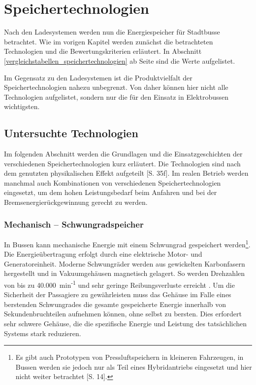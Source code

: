 \chapter{Speichertechnologien}

Nach den Ladesystemen werden nun die Energiespeicher für Stadtbusse betrachtet. Wie im vorigen Kapitel werden zunächst die betrachteten Technologien und die Bewertungskriterien erläutert. In Abschnitt \ref{vergleichstabellen_speichertechnologien} ab Seite \pageref{vergleichstabellen_speichertechnologien} sind die Werte aufgelistet.

Im Gegensatz zu den Ladesystemen ist die Produktvielfalt der Speichertechnologien nahezu unbegrenzt. Von daher können hier nicht alle Technologien aufgelistet, sondern nur die für den Einsatz in Elektrobussen wichtigsten. 

\section{Untersuchte Technologien}
Im folgenden Abschnitt werden die Grundlagen und die Einsatzgeschichten der verschiedenen Speichertechnologien kurz erläutert. Die Technologien sind nach dem genutzten physikalischen Effekt aufgeteilt \cite{Sterner:2014}[S. 35f]. Im realen Betrieb werden manchmal auch Kombinationen von verschiedenen Speichertechnologien eingesetzt, um dem hohen Leistungsbedarf beim Anfahren und bei der Bremsenergierückgewinnung gerecht zu werden.

\subsection{Mechanisch – Schwungradspeicher}
In Bussen kann mechanische Energie mit einem Schwungrad gespeichert werden\footnote{Es gibt auch Prototypen von Pressluftspeichern in kleineren Fahrzeugen, in Bussen werden sie jedoch nur als Teil eines Hybridantriebs eingesetzt und hier nicht weiter betrachtet \cite{Sebastian-Naumann:2014}[S. 14].}. Die Energieübertragung erfolgt durch eine elektrische Motor- und Generatoreinheit. Moderne Schwungräder werden aus gewickelten Karbonfasern hergestellt und in Vakuumgehäusen magnetisch gelagert. So werden Drehzahlen von bis zu 40.000~min\textsuperscript{-1} und sehr geringe Reibungsverluste erreicht \cite{993788}. Um die Sicherheit der Passagiere zu gewährleisten muss das Gehäuse im Falle eines berstenden Schwungrades die gesamte gespeicherte Energie innerhalb von Sekundenbruchteilen aufnehmen können, ohne selbst zu bersten. Dies erfordert sehr schwere Gehäuse, die die spezifische Energie und Leistung des tatsächlichen Systems stark reduzieren.

